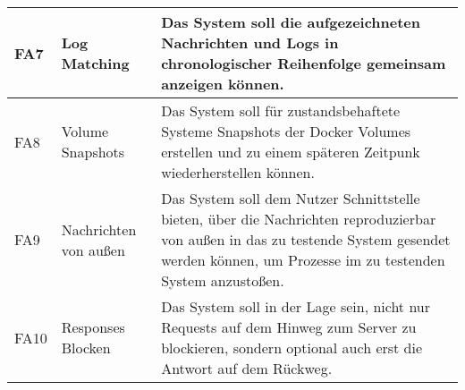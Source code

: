 \documentclass[a4paper]{report}
\begin{document}
\begin{table}[]
\begin{tabular}{|l|l|p{7cm}|}
		FA7  & Log Matching                  & Das System soll die aufgezeichneten Nachrichten und Logs in chronologischer Reihenfolge gemeinsam anzeigen können.                                                                                                    \\ \hline
		FA8  & Volume Snapshots              & Das System soll für zustandsbehaftete Systeme Snapshots der Docker Volumes erstellen und zu einem späteren Zeitpunk wiederherstellen können.                                                                          \\ \hline
		FA9  & Nachrichten von außen         & Das System soll dem Nutzer Schnittstelle bieten, über die Nachrichten reproduzierbar von außen in das zu testende System gesendet werden können, um Prozesse im zu testenden System anzustoßen.                       \\ \hline
		FA10 & Responses Blocken             & Das System soll in der Lage sein, nicht nur Requests auf dem Hinweg zum Server zu blockieren, sondern optional auch erst die Antwort auf dem Rückweg.                                                                 \\ \hline
	\end{tabular}
\end{table}
\end{document}
